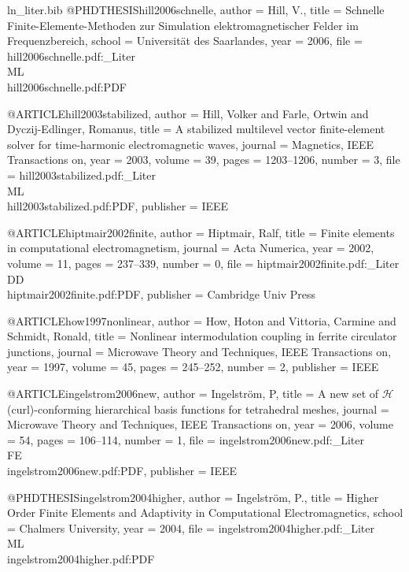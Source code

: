 \begin{filecontents*}{ln_liter.bib}
@PHDTHESIS{hill2006schnelle,
  author = {Hill, V.},
  title = {Schnelle Finite-Elemente-Methoden zur Simulation elektromagnetischer
	Felder im Frequenzbereich},
  school = {Universit\"at des Saarlandes},
  year = {2006},
  file = {hill2006schnelle.pdf:_Liter\\ML\\hill2006schnelle.pdf:PDF}
}

@ARTICLE{hill2003stabilized,
  author = {Hill, Volker and Farle, Ortwin and Dyczij-Edlinger, Romanus},
  title = {A stabilized multilevel vector finite-element solver for time-harmonic
	electromagnetic waves},
  journal = {Magnetics, IEEE Transactions on},
  year = {2003},
  volume = {39},
  pages = {1203--1206},
  number = {3},
  file = {hill2003stabilized.pdf:_Liter\\ML\\hill2003stabilized.pdf:PDF},
  publisher = {IEEE}
}

@ARTICLE{hiptmair2002finite,
  author = {Hiptmair, Ralf},
  title = {Finite elements in computational electromagnetism},
  journal = {Acta Numerica},
  year = {2002},
  volume = {11},
  pages = {237--339},
  number = {0},
  file = {hiptmair2002finite.pdf:_Liter\\DD\\hiptmair2002finite.pdf:PDF},
  publisher = {Cambridge Univ Press}
}

@ARTICLE{how1997nonlinear,
  author = {How, Hoton and Vittoria, Carmine and Schmidt, Ronald},
  title = {Nonlinear intermodulation coupling in ferrite circulator junctions},
  journal = {Microwave Theory and Techniques, IEEE Transactions on},
  year = {1997},
  volume = {45},
  pages = {245--252},
  number = {2},
  publisher = {IEEE}
}

@ARTICLE{ingelstrom2006new,
  author = {Ingelstr{\"o}m, P},
  title = {A new set of $\mathcal{H}$(curl)-conforming hierarchical basis functions
	for tetrahedral meshes},
  journal = {Microwave Theory and Techniques, IEEE Transactions on},
  year = {2006},
  volume = {54},
  pages = {106--114},
  number = {1},
  file = {ingelstrom2006new.pdf:_Liter\\FE\\ingelstrom2006new.pdf:PDF},
  publisher = {IEEE}
}

@PHDTHESIS{ingelstrom2004higher,
  author = {Ingelstr{\"o}m, P.},
  title = {Higher Order Finite Elements and Adaptivity in Computational Electromagnetics},
  school = {Chalmers University},
  year = {2004},
  file = {ingelstrom2004higher.pdf:_Liter\\ML\\ingelstrom2004higher.pdf:PDF}
}


\end{filecontents*}
